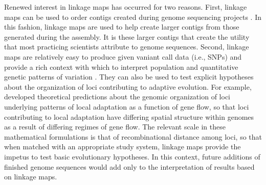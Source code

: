 \documentclass[11pt]{article}
\begin{document}
Renewed interest in linkage maps has occurred for two reasons. First, linkage maps can be used to order contigs 
created during genome sequencing projects \citep{Mackay:2012, Martinez-Garcia:2013}. In this fashion, linkage 
maps are used to help create larger contigs from those generated during the assembly. It is these larger contigs that 
create the utility that most practicing scientists attribute to genome sequences. Second, linkage maps are relatively 
easy to produce given vaniant call data (i.e., SNPs) and provide a rich context with which to interpret population and quantitative 
genetic patterns of variation 
\citep[e.g.][]{Eckert:2010a, Eckert:2010b, Eckert:2013a, Yeaman:2013}. They can also be used to test explicit hypotheses about 
the organization of loci contributing to adaptive evolution. For example, \citet{Yeaman:2011} developed theoretical 
predictions about the genomic organization of loci underlying patterns of local adaptation as a function of gene flow, 
so that loci contributing to local adaptation have differing spatial structure within genomes as a result of differing 
regimes of gene flow. The relevant scale \citep[\textit{sensu}][]{Houle:2011} in these mathematical formulations is that 
of recombinational distance among loci, so that when matched with an appropriate study system, 
linkage maps provide the impetus to test basic evolutionary hypotheses. In this context, future additions of finished 
genome sequences would add only to the interpretation of results based on linkage maps.
\end{document}
